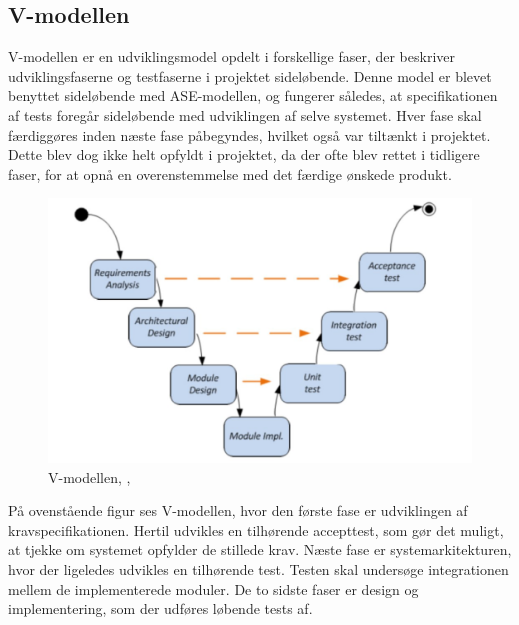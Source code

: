 \subsection{V-modellen}
V-modellen er en udviklingsmodel opdelt i forskellige faser, der beskriver udviklingsfaserne og testfaserne i projektet sideløbende. Denne model er blevet benyttet sideløbende med ASE-modellen, og fungerer således, at specifikationen af tests foregår sideløbende med udviklingen af selve systemet. Hver fase skal færdiggøres inden næste fase påbegyndes, hvilket også var tiltænkt i projektet. Dette blev dog ikke helt opfyldt i projektet, da der ofte blev rettet i tidligere faser, for at opnå en overenstemmelse med det færdige ønskede produkt. 
\begin{figure}[H]
	\centering
	\includegraphics[width=1\textwidth]{Figurer/vmodel}
	\caption{V-modellen, \protect\cite[s. 4]{Vejledning}, \protect\cite{ISE}}
\end{figure}
På ovenstående figur ses V-modellen, hvor den første fase er udviklingen af kravspecifikationen. Hertil udvikles en tilhørende accepttest, som gør det muligt, at tjekke om systemet opfylder de stillede krav. Næste fase er systemarkitekturen, hvor der ligeledes udvikles en tilhørende test. Testen skal undersøge integrationen mellem de implementerede moduler. De to sidste faser er design og implementering, som der udføres løbende tests af. 


